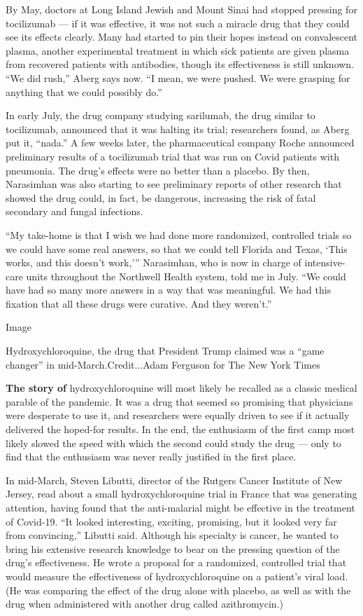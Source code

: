 By May, doctors at Long Island Jewish and Mount Sinai had stopped
pressing for tocilizumab --- if it was effective, it was not such a
miracle drug that they could see its effects clearly. Many had started
to pin their hopes instead on convalescent plasma, another experimental
treatment in which sick patients are given plasma from recovered
patients with antibodies, though its effectiveness is still unknown.
``We did rush,'' Aberg says now. ``I mean, we were pushed. We were
grasping for anything that we could possibly do.''

In early July, the drug company studying sarilumab, the drug similar to
tocilizumab, announced that it was halting its trial; researchers found,
as Aberg put it, ``nada.'' A few weeks later, the pharmaceutical company
Roche announced preliminary results of a tocilizumab trial that was run
on Covid patients with pneumonia. The drug's effects were no better than
a placebo. By then, Narasimhan was also starting to see preliminary
reports of other research that showed the drug could, in fact, be
dangerous, increasing the risk of fatal secondary and fungal infections.

``My take-home is that I wish we had done more randomized, controlled
trials so we could have some real answers, so that we could tell Florida
and Texas, `This works, and this doesn't work,''' Narasimhan, who is now
in charge of intensive-care units throughout the Northwell Health
system, told me in July. ``We could have had so many more answers in a
way that was meaningful. We had this fixation that all these drugs were
curative. And they weren't.''

Image

Hydroxychloroquine, the drug that President Trump claimed was a ``game
changer'' in mid-March.Credit...Adam Ferguson for The New York Times

\textbf{The story of} hydroxychloroquine will most likely be recalled as
a classic medical parable of the pandemic. It was a drug that seemed so
promising that physicians were desperate to use it, and researchers were
equally driven to see if it actually delivered the hoped-for results. In
the end, the enthusiasm of the first camp most likely slowed the speed
with which the second could study the drug --- only to find that the
enthusiasm was never really justified in the first place.

In mid-March, Steven Libutti, director of the Rutgers Cancer Institute
of New Jersey, read about a small hydroxychloroquine trial in France
that was generating attention, having found that the anti-malarial might
be effective in the treatment of Covid-19. ``It looked interesting,
exciting, promising, but it looked very far from convincing,'' Libutti
said. Although his specialty is cancer, he wanted to bring his extensive
research knowledge to bear on the pressing question of the drug's
effectiveness. He wrote a proposal for a randomized, controlled trial
that would measure the effectiveness of hydroxychloroquine on a
patient's viral load. (He was comparing the effect of the drug alone
with placebo, as well as with the drug when administered with another
drug called azithromycin.)

